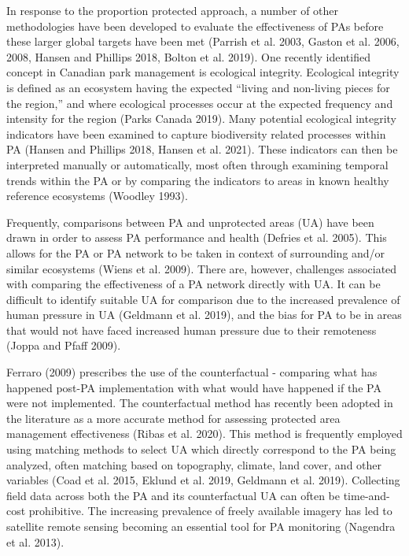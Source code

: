\documentclass[11pt]{article}
\begin{document}
In response to the proportion protected approach, a number of other
methodologies have been developed to evaluate the effectiveness of PAs
before these larger global targets have been met (Parrish et al. 2003,
Gaston et al. 2006, 2008, Hansen and Phillips 2018, Bolton et al. 2019).
One recently identified concept in Canadian park management is
ecological integrity. Ecological integrity is defined as an ecosystem
having the expected ``living and non-living pieces for the region,'' and
where ecological processes occur at the expected frequency and intensity
for the region (Parks Canada 2019). Many potential ecological integrity
indicators have been examined to capture biodiversity related processes
within PA (Hansen and Phillips 2018, Hansen et al. 2021). These
indicators can then be interpreted manually or automatically, most often
through examining temporal trends within the PA or by comparing the
indicators to areas in known healthy reference ecosystems (Woodley
1993).

Frequently, comparisons between PA and unprotected areas (UA) have been
drawn in order to assess PA performance and health (Defries et al.
2005). This allows for the PA or PA network to be taken in context of
surrounding and/or similar ecosystems (Wiens et al. 2009). There are,
however, challenges associated with comparing the effectiveness of a PA
network directly with UA. It can be difficult to identify suitable UA
for comparison due to the increased prevalence of human pressure in UA
(Geldmann et al. 2019), and the bias for PA to be in areas that would
not have faced increased human pressure due to their remoteness (Joppa
and Pfaff 2009).

Ferraro (2009) prescribes the use of the counterfactual - comparing what
has happened post-PA implementation with what would have happened if the
PA were not implemented. The counterfactual method has recently been
adopted in the literature as a more accurate method for assessing
protected area management effectiveness (Ribas et al. 2020). This method
is frequently employed using matching methods to select UA which
directly correspond to the PA being analyzed, often matching based on
topography, climate, land cover, and other variables (Coad et al. 2015,
Eklund et al. 2019, Geldmann et al. 2019). Collecting field data across
both the PA and its counterfactual UA can often be time-and-cost
prohibitive. The increasing prevalence of freely available imagery has
led to satellite remote sensing becoming an essential tool for PA
monitoring (Nagendra et al. 2013).
\end{document}
